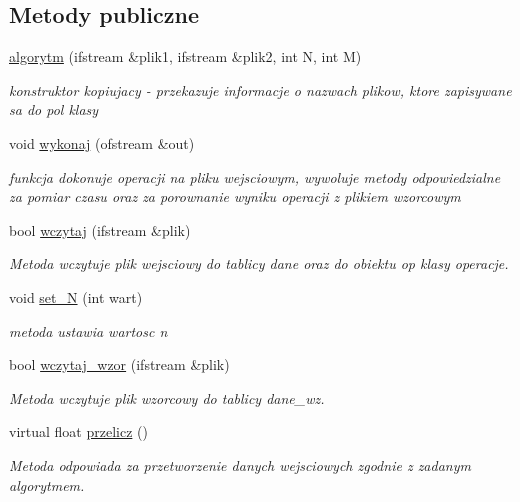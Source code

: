 \subsection*{\-Metody publiczne}
\begin{DoxyCompactItemize}
\item 
\hyperlink{classalgorytm_af51409bfda664789d3a970bb0aa91f41}{algorytm} (ifstream \&plik1, ifstream \&plik2, int \-N, int \-M)
\begin{DoxyCompactList}\small\item\em konstruktor kopiujacy -\/ przekazuje informacje o nazwach plikow, ktore zapisywane sa do pol klasy \end{DoxyCompactList}\item 
void \hyperlink{classalgorytm_a0264787ff113740826ef1368d98dd019}{wykonaj} (ofstream \&out)
\begin{DoxyCompactList}\small\item\em funkcja dokonuje operacji na pliku wejsciowym, wywoluje metody odpowiedzialne za pomiar czasu oraz za porownanie wyniku operacji z plikiem wzorcowym \end{DoxyCompactList}\item 
bool \hyperlink{classalgorytm_aa12f93ae34e49251044a72fd76ce3ebb}{wczytaj} (ifstream \&plik)
\begin{DoxyCompactList}\small\item\em \-Metoda wczytuje plik wejsciowy do tablicy {\ttfamily dane} oraz do obiektu {\ttfamily op} klasy {\ttfamily operacje}. \end{DoxyCompactList}\item 
void \hyperlink{classalgorytm_a006ea8d2296b419f128fb936bad49c50}{set\-\_\-\-N} (int wart)
\begin{DoxyCompactList}\small\item\em metoda ustawia wartosc n \end{DoxyCompactList}\item 
bool \hyperlink{classalgorytm_abf132ac5055b185a380f1285a29f75fd}{wczytaj\-\_\-wzor} (ifstream \&plik)
\begin{DoxyCompactList}\small\item\em \-Metoda wczytuje plik wzorcowy do tablicy {\ttfamily dane\-\_\-wz}. \end{DoxyCompactList}\item 
virtual float \hyperlink{classalgorytm_af3f92bf537b1f2e1f93173983e838449}{przelicz} ()
\begin{DoxyCompactList}\small\item\em \-Metoda odpowiada za przetworzenie danych wejsciowych zgodnie z zadanym algorytmem. \end{DoxyCompactList}\item 

\end{DoxyCompactItemize}
